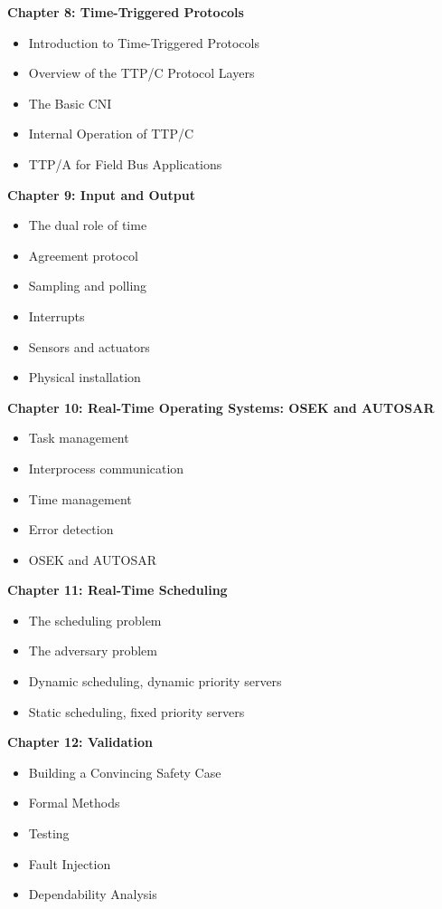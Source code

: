 \textbf{Chapter 8: Time-Triggered Protocols}

\begin{itemize}
\item
  Introduction to Time-Triggered Protocols
\item
  Overview of the TTP/C Protocol Layers
\item
  The Basic CNI
\item
  Internal Operation of TTP/C
\item
  TTP/A for Field Bus Applications
\end{itemize}

\textbf{Chapter 9: Input and Output}

\begin{itemize}
\item
  The dual role of time
\item
  Agreement protocol
\item
  Sampling and polling
\item
  Interrupts
\item
  Sensors and actuators
\item
  Physical installation
\end{itemize}

\textbf{Chapter 10: Real-Time Operating Systems: OSEK and AUTOSAR}

\begin{itemize}
\item
  Task management
\item
  Interprocess communication
\item
  Time management
\item
  Error detection
\item
  OSEK and AUTOSAR
\end{itemize}

\textbf{Chapter 11: Real-Time Scheduling}

\begin{itemize}
\item
  The scheduling problem
\item
  The adversary problem
\item
  Dynamic scheduling, dynamic priority servers
\item
  Static scheduling, fixed priority servers
\end{itemize}

\textbf{Chapter 12: Validation}

\begin{itemize}
\item
  Building a Convincing Safety Case
\item
  Formal Methods
\item
  Testing
\item
  Fault Injection
\item
  Dependability Analysis
\end{itemize}

